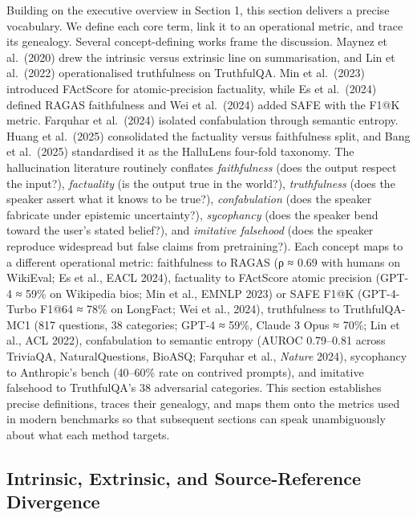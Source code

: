\documentclass{article}
\begin{document}
Building on the executive overview in Section 1, this section delivers a precise vocabulary. We define each core term, link it to an operational metric, and trace its genealogy. Several concept-defining works frame the discussion. Maynez et al.~(2020) drew the intrinsic versus extrinsic line on summarisation, and Lin et al.~(2022) operationalised truthfulness on TruthfulQA. Min et al.~(2023) introduced FActScore for atomic-precision factuality, while Es et al.~(2024) defined RAGAS faithfulness and Wei et al.~(2024) added SAFE with the F1@K metric. Farquhar et al.~(2024) isolated confabulation through semantic entropy. Huang et al.~(2025) consolidated the factuality versus faithfulness split, and Bang et al.~(2025) standardised it as the HalluLens four-fold taxonomy. The hallucination literature routinely conflates \emph{faithfulness} (does the output respect the input?), \emph{factuality} (is the output true in the world?), \emph{truthfulness} (does the speaker assert what it knows to be true?), \emph{confabulation} (does the speaker fabricate under epistemic uncertainty?), \emph{sycophancy} (does the speaker bend toward the user's stated belief?), and \emph{imitative falsehood} (does the speaker reproduce widespread but false claims from pretraining?). Each concept maps to a different operational metric: faithfulness to RAGAS (ρ ≈ 0.69 with humans on WikiEval; Es et al., EACL 2024), factuality to FActScore atomic precision (GPT-4 ≈ 59\% on Wikipedia bios; Min et al., EMNLP 2023) or SAFE F1@K (GPT-4-Turbo F1@64 ≈ 78\% on LongFact; Wei et al., 2024), truthfulness to TruthfulQA-MC1 (817 questions, 38 categories; GPT-4 ≈ 59\%, Claude 3 Opus ≈ 70\%; Lin et al., ACL 2022), confabulation to semantic entropy (AUROC 0.79--0.81 across TriviaQA, NaturalQuestions, BioASQ; Farquhar et al., \emph{Nature} 2024), sycophancy to Anthropic's bench (40--60\% rate on contrived prompts), and imitative falsehood to TruthfulQA's 38 adversarial categories. This section establishes precise definitions, traces their genealogy, and maps them onto the metrics used in modern benchmarks so that subsequent sections can speak unambiguously about what each method targets.

\subsection{Intrinsic, Extrinsic, and Source-Reference Divergence}\label{intrinsic-extrinsic-and-source-reference-divergence}
\end{document}

